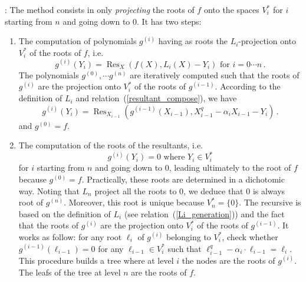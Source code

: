 \documentclass{sig-alternate}
\DeclareMathOperator{\Res}{Res}
\begin{document}
: The method consists in only \emph{projecting} the roots of $f$ onto the spaces $V_i^\ast$ for $i$ starting from $n$ and going down to 0.
It has two steps:
\begin{enumerate}
\item The computation of polynomials $g^{(i)}$ having as roots the $L_i$-projection onto $V_i^\ast$ of the roots of $f$,  i.e.
  $$g^{(i)}(Y_i)=\Res_{X}(f(X), L_i(X)-Y_i )  \mbox{ for }i=0 \cdots n \,.$$
  The polynomials $g^{(0)}, \cdots g^{(n)}$ are iteratively computed such that the roots of $g^{(i)}$ are the projection onto 
  $V_i^\ast$ of the roots of $g^{(i-1)}$. According to the definition of $L_i$ and relation~(\ref{resultant_compose}), we have
  $$g^{(i)}(Y_i)=\Res_{X_{i-1}}(g^{(i-1)}(X_{i-1}),X^q_{i-1} - \alpha_i X_{i-1} -Y_i ) \,.$$
 and $g ^{(0)}=f$.
\item The computation of the roots of the resultants, i.e.
$$g^{(i)}(Y_i)=0  \mbox{ where }  Y_i \in   V_i^\ast$$
for $i$ starting from $n$ and going down to 0, leading ultimately to the root of $f$ because $g^{(0)}=f$. Practically, these roots 
are determined in a dichotomic way. Noting that $L_n$ project all the roots to $0$,
 we deduce that $0$ is always root of $g^{(n)}$. Moreover, this root is unique because $V_n^\ast=\{0\}$.
The recursive is based on the definition of $L_i$ (see relation~(\ref{Li_generation})) and the fact that the roots of $g^{(i)}$ are the projection onto 
  $V_i^\ast$ of the roots of $g^{(i-1)}$. It works as follow: for any root $\ell_i$ of $g^{(i)}$ belonging to $V_i^\ast$, check whether $g^{(i-1)}(\ell_{i-1})=0$
   for any $\ell_{i-1} \in V_i^\ast$ such that $\ell_{i-1}^q-\alpha_i \cdot \ell_{i-1}=\ell_i$. This procedure builds a tree where at level $i$ the nodes are the roots of $g^{(i)}$. 
   The leafs of the tree at level $n$ are the roots of $f$.
\end{enumerate}
  
\end{document}
